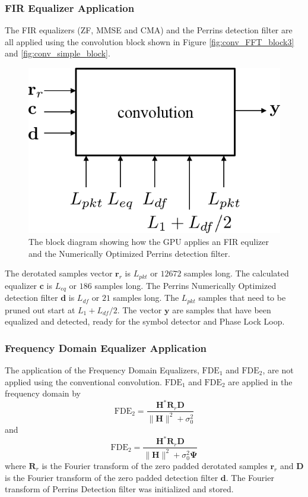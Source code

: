 \subsubsection{FIR Equalizer Application}
The FIR equalizers (ZF, MMSE and CMA) and the Perrins detection filter are all applied using the convolution block shown in Figure \ref{fig:conv_FFT_block3} and \ref{fig:conv_simple_block}.
\begin{figure}
	\centering\includegraphics[width=\textwidth/10*5]{figures/gpu/apply_FIR_equalizer.png}
	\caption{The block diagram showing how the GPU applies an FIR equlizer and the Numerically Optimized Perrins detection filter.}
	\label{fig:apply_FIR_equalizer}
\end{figure}
The derotated samples vector $\mathbf{r}_r$ is $L_{pkt}$ or $12672$ samples long.
The calculated equalizer $\mathbf{c}$ is $L_{eq}$ or $186$ samples long.
The Perrins Numerically Optimized detection filter $\mathbf{d}$ is $L_{df}$ or $21$ samples long.
The $L_{pkt}$ samples that need to be pruned out start at $L_1+L_{df}/2$.
The vector $\mathbf{y}$ are samples that have been equalized and detected, ready for the symbol detector and Phase Lock Loop.

\clearpage
\subsubsection{Frequency Domain Equalizer Application}
The application of the Frequency Domain Equalizers, $\text{FDE}_1$ and $\text{FDE}_2$, are not applied using the conventional convolution.
$\text{FDE}_1$ and $\text{FDE}_2$ are applied in the frequency domain by
\begin{equation}
\text{FDE}_2 = \frac{\mathbf{H}^*\mathbf{R}_r \mathbf{D}}{\|\mathbf{H}\|^2 + \sigma_0^2}
\label{eq:apply_FDE1}
\end{equation}
and
\begin{equation}
\text{FDE}_2 = \frac{\mathbf{H}^*\mathbf{R}_r \mathbf{D}}{\|\mathbf{H}\|^2 + \sigma_0^2 \mathbf{\Psi}}
\label{eq:apply_FDE2}
\end{equation}
where $\mathbf{R}_r$ is the Fourier transform of the zero padded derotated samples $\mathbf{r}_r$ and $\mathbf{D}$ is the Fourier transform of the zero padded detection filter $\mathbf{d}$.
The Fourier transform of Perrins Detection filter was initialized and stored.

